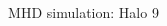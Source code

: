 \documentclass[xcolor=dvipsnames]{beamer}
\begin{document}
\begin{frame}[plain]
\begin{columns}[c]
\begin{column}{.5\textwidth}
\begin{figure}
\end{figure}

\end{column}

\begin{column}{.5\textwidth}

\begin{figure}

\caption{\tiny MHD simulation: Halo 9}

\end{figure}


\end{column}

\end{columns}

\end{frame}
\end{document}
